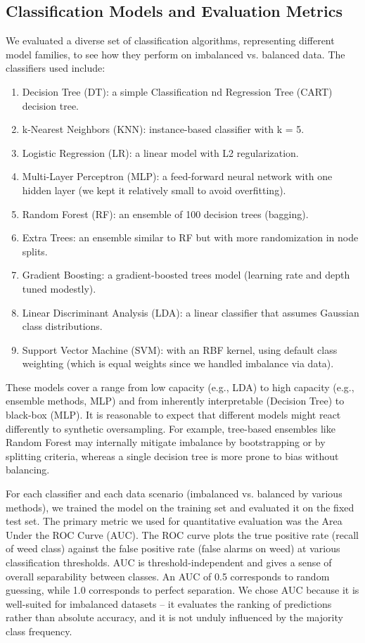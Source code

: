 \documentclass[agriengineering,article,submit,pdftex,moreauthors]{Definitions/mdpi}
\begin{document}
 \subsection{Classification Models and Evaluation Metrics}
 We evaluated a diverse set of classification algorithms, representing different model families, to see how they perform on imbalanced vs. balanced data. The classifiers used include:

\begin{enumerate} 
	\item{Decision Tree (DT): a simple Classification nd Regression Tree (CART) decision tree.}
	\item{k-Nearest Neighbors (KNN): instance-based classifier with k = 5.}
	\item{Logistic Regression (LR): a linear model with L2 regularization.}
	\item{Multi-Layer Perceptron (MLP): a feed-forward neural network with one hidden layer (we kept it relatively small to avoid overfitting).}
	\item{Random Forest (RF): an ensemble of 100 decision trees (bagging).}
	\item{Extra Trees: an ensemble similar to RF but with more randomization in node splits.}
	\item{Gradient Boosting: a gradient-boosted trees model (learning rate and depth tuned modestly).}
	\item{Linear Discriminant Analysis (LDA): a linear classifier that assumes Gaussian class distributions.}
	\item{Support Vector Machine (SVM): with an RBF kernel, using default class weighting (which is equal weights since we handled imbalance via data).}
\end{enumerate}
These models cover a range from low capacity (e.g., LDA) to high capacity (e.g., ensemble methods, MLP) and from inherently interpretable (Decision Tree) to black-box (MLP). It is reasonable to expect that different models might react differently to synthetic oversampling. For example, tree-based ensembles like Random Forest may internally mitigate imbalance by bootstrapping or by splitting criteria, whereas a single decision tree is more prone to bias without balancing. 

For each classifier and each data scenario (imbalanced vs. balanced by various methods), we trained the model on the training set and evaluated it on the fixed test set. The primary metric we used for quantitative evaluation was the Area Under the ROC Curve (AUC). The ROC curve plots the true positive rate (recall of weed class) against the false positive rate (false alarms on weed) at various classification thresholds. AUC is threshold-independent and gives a sense of overall separability between classes. An AUC of 0.5 corresponds to random guessing, while 1.0 corresponds to perfect separation. We chose AUC because it is well-suited for imbalanced datasets – it evaluates the ranking of predictions rather than absolute accuracy, and it is not unduly influenced by the majority class frequency.
\end{document}
